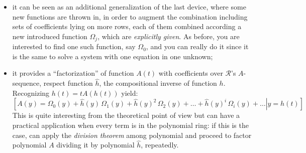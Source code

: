 \documentclass[11pt,a4paper]{article} %
\begin{document}
    \begin{itemize}
        \item it can be seen as an additional generalization of the last device,
            where some new functions are thrown in, in order to augment the
            combination including sets of coefficients lying on more rows, 
            each of them combined according a new introduced function $\Omega_{j}$,
            which are \emph{explicitly given}.  As before,
            you are interested to find one such function, say $\Omega_{0}$,
            and you can really do it since it is the same to solve a system
            with one equation in one unknown;
        \item it provides a ``factorization'' of function $A(t)$ with coefficients
            over $\mathcal{R}$'s $A$-sequence, respect function $\hat{h}$, 
            the compositional inverse of function $h$.  
            Recognizing $h(t)=tA(h(t))$ yield:
            \begin{displaymath}
                \left.\left[
                    A(y) =  \Omega_{0}(y) + 
                    \hat{h}(y)\,\Omega_{1}(y) + \hat{h}(y)^{2}\,\Omega_{2}(y) + \ldots +
                    \hat{h}(y)^{i}\,\Omega_{i}(y) + \ldots
                    \right| y = h(t) \right]
            \end{displaymath}
            This is quite interesting from the theoretical point of 
            view but can have a practical application
            when every term is in the polynomial ring: if this is the case,
            can apply the \emph{division theorem} among polynomial and 
            proceed to factor polynomial $A$ dividing it by polynomial $\hat{h}$,
            repeatedly.


\end{itemize}
\end{document}
